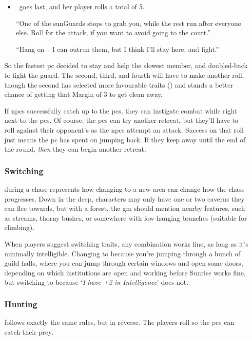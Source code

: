 \begin{multicols}{2}
\begin{exampletext}
\begin{itemize}
  {\sffamily ``Three of the \glspl{sunGuard} chase you into a herd of cows, bound for slaughter at the market.
  Add .''}
  \item
  \composeHumanName\ goes last, and her player rolls a total of 5.

  {\sffamily ``One of the \glspl{sunGuard} stops to grab you, while the rest run after everyone else.
  Roll for the attack, if you want to avoid going to the \gls{court}.''}

  {\textit\sffamily ``Hang on -- I can outrun them, but I think I'll stay here, and fight.''}
  \end{itemize}

  So the fastest \gls{pc} decided to stay and help the slowest member, and doubled-back to fight the guard.
  The second, third, and fourth will have to make another roll, though the second has selected more favourable \glspl{trait} () and stands a better chance of getting that Margin of 3 to get clean away.
\end{exampletext}

If \glspl{npc} successfully catch up to the \glspl{pc}, they can instigate combat while right next to the \glspl{pc}.
Of course, the \glspl{pc} can try another \gls{retreat}, but they'll have to roll  against their opponent's  as the \glspl{npc} attempt an attack.
Success on that roll just means the \gls{pc} has spent  on jumping back.
If they keep away until the end of the \gls{round}, \emph{then} they can begin another \gls{retreat}.

\subsubsection{Switching }
during a chase represents how changing to a new \gls{area} can change how the chase progresses.
Down in the \gls{deep}, characters may only have one or two caverns they can flee towards, but with a forest, the \gls{gm} should mention nearby features, such as streams, thorny bushes, or somewhere with low-hanging branches (suitable for climbing).

When players suggest switching \glspl{trait}, any combination works fine, as long as it's minimally intelligible.
Changing to  because you're jumping through a bunch of guild halls, where you can jump through certain windows and open some doors, depending on which institutions are open and working before Sunrise works fine, but switching to  because `\textit{I have +2 in Intelligence}' does not.

\subsubsection{Hunting}
follows exactly the same rules, but in reverse.
The players roll so the \glspl{pc} can catch their prey.

\end{multicols}
